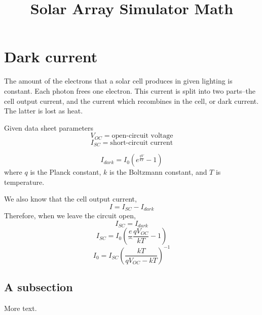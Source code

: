 \documentclass[11pt]{article} %
\title{Solar Array Simulator Math}
\begin{document}
\maketitle

\section{Dark current}
The amount of the electrons that a solar cell produces in given lighting is constant. Each photon frees one electron. This current is split into two parts--the cell output current, and the current which recombines in the cell, or dark current. The latter is lost as heat.

Given data sheet parameters
$$V_{OC} = \mbox{open-circuit voltage}$$
$$I_{SC} = \mbox{short-circuit current}$$ 

$$I_{dark} = I_0\left(e^{\frac {qV} {kT}} - 1\right)$$
where $q$ is the Planck constant, $k$ is the Boltzmann constant, and $T$ is temperature.

We also know that the cell output current,
$$I = I_{SC} - I_{dark}$$
Therefore, when we leave the circuit open,
$$I_{SC} = I_{dark}$$
$$I_{SC} = I_0\left(\frac e^{\frac {qV_{OC}} {kT}} - 1\right)$$
$$I_{0} = I_{SC}{\left(\frac {kT} {qV_{OC} - kT}\right)}^{-1}$$


\subsection{A subsection}

More text.
\end{document}
